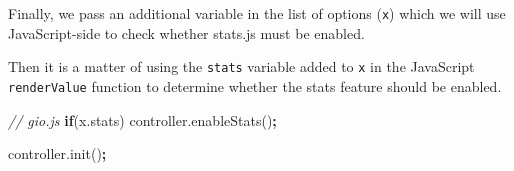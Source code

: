 \documentclass[
  10pt,
]{krantz}
\makeatletter
\newenvironment{Shaded}{\begin{snugshade}}{\end{snugshade}}
\newcommand{\AttributeTok}[1]{\textcolor[rgb]{0.61,0.61,0.61}{#1}}
\newcommand{\CommentTok}[1]{\textcolor[rgb]{0.37,0.37,0.37}{\textit{#1}}}
\newcommand{\ControlFlowTok}[1]{\textcolor[rgb]{0.27,0.27,0.27}{\textbf{#1}}}
\newcommand{\DataTypeTok}[1]{\textcolor[rgb]{0.27,0.27,0.27}{#1}}
\newcommand{\KeywordTok}[1]{\textcolor[rgb]{0.27,0.27,0.27}{\textbf{#1}}}
\newcommand{\NormalTok}[1]{#1}
\newcommand{\OperatorTok}[1]{\textcolor[rgb]{0.43,0.43,0.43}{\textbf{#1}}}
\newcommand{\OtherTok}[1]{\textcolor[rgb]{0.37,0.37,0.37}{#1}}
\newcommand{\StringTok}[1]{\textcolor[rgb]{0.5,0.5,0.5}{#1}}
\newcommand{\VariableTok}[1]{\textcolor[rgb]{0,0,0}{#1}}
\newenvironment{kframe}{%
\medskip{}
\setlength{\fboxsep}{.8em}
 \def\at@end@of@kframe{}%
 \ifinner\ifhmode%
  \def\at@end@of@kframe{\end{minipage}}%
  \begin{minipage}{\columnwidth}%
 \fi\fi%
 \def\FrameCommand##1{\hskip\@totalleftmargin \hskip-\fboxsep
 \colorbox{shadecolor}{##1}\hskip-\fboxsep
     \hskip-\linewidth \hskip-\@totalleftmargin \hskip\columnwidth}%
 \MakeFramed {\advance\hsize-\width
   \@totalleftmargin\z@ \linewidth\hsize
   \@setminipage}}%
 {\par\unskip\endMakeFramed%
 \at@end@of@kframe}
\renewenvironment{Shaded}{\begin{kframe}}{\end{kframe}}
\makeatother
\begin{document}
Finally, we pass an additional variable in the list of options (\texttt{x}) which we will use JavaScript-side to check whether stats.js must be enabled.

\begin{Shaded}
\end{Shaded}

Then it is a matter of using the \texttt{stats} variable added to \texttt{x} in the JavaScript \texttt{renderValue} function to determine whether the stats feature should be enabled.

\begin{Shaded}
\begin{Highlighting}[]
\CommentTok{// gio.js}
\ControlFlowTok{if}\NormalTok{(}\VariableTok{x}\NormalTok{.}\AttributeTok{stats}\NormalTok{)}
  \VariableTok{controller}\NormalTok{.}\AttributeTok{enableStats}\NormalTok{()}\OperatorTok{;}

\VariableTok{controller}\NormalTok{.}\AttributeTok{init}\NormalTok{()}\OperatorTok{;}
\end{Highlighting}
\end{Shaded}
\end{document}
